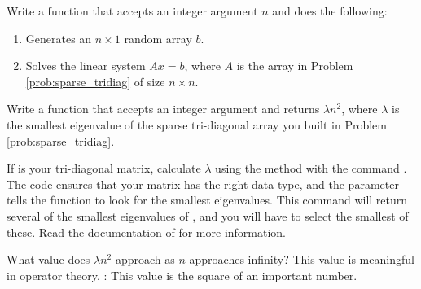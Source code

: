 \begin{problem}
Write a function that accepts an integer argument $n$ and does the following:
\begin{enumerate}
\item Generates an $n \times 1$ random array $b$.
\item Solves the linear system $Ax = b$, where $A$ is the array in Problem \ref{prob:sparse_tridiag} of size $n \times n$.
\end{enumerate}
\end{problem}



\begin{problem}
Write a function that accepts an integer argument  and returns $\lambda n^2$, where
$\lambda$ is the smallest eigenvalue of the sparse tri-diagonal array you built in Problem \ref{prob:sparse_tridiag}.

If  is your tri-diagonal matrix, calculate $\lambda$ using the method  with the command . 
The code  ensures that your matrix has the right data type, and the parameter  tells the function to look for the smallest eigenvalues. 
This command will return several of the smallest eigenvalues of , and you will have to select the smallest of these. 
Read the documentation of  for more information.

What value does $\lambda n^2$ approach as $n$ approaches infinity? 
This value is meaningful in operator theory. 
: This value is the square of an important number.

\end{problem}





 
